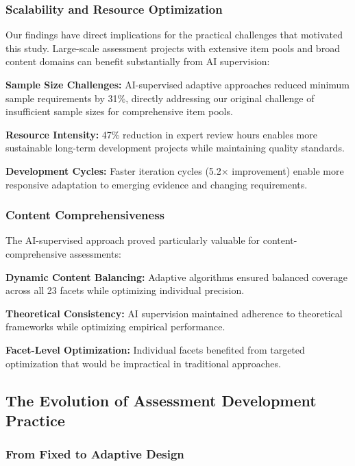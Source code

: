 \documentclass[12pt,a4paper]{article}
\begin{document}
\subsubsection{Scalability and Resource Optimization}

Our findings have direct implications for the practical challenges that motivated this study. Large-scale assessment projects with extensive item pools and broad content domains can benefit substantially from AI supervision:

\textbf{Sample Size Challenges:} AI-supervised adaptive approaches reduced minimum sample requirements by 31\%, directly addressing our original challenge of insufficient sample sizes for comprehensive item pools.

\textbf{Resource Intensity:} 47\% reduction in expert review hours enables more sustainable long-term development projects while maintaining quality standards.

\textbf{Development Cycles:} Faster iteration cycles (5.2× improvement) enable more responsive adaptation to emerging evidence and changing requirements.

\subsubsection{Content Comprehensiveness}

The AI-supervised approach proved particularly valuable for content-comprehensive assessments:

\textbf{Dynamic Content Balancing:} Adaptive algorithms ensured balanced coverage across all 23 facets while optimizing individual precision.

\textbf{Theoretical Consistency:} AI supervision maintained adherence to theoretical frameworks while optimizing empirical performance.

\textbf{Facet-Level Optimization:} Individual facets benefited from targeted optimization that would be impractical in traditional approaches.

\subsection{The Evolution of Assessment Development Practice}

\subsubsection{From Fixed to Adaptive Design}
\end{document}
